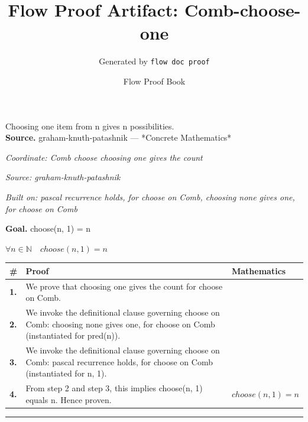 \documentclass[11pt]{article}
\title{Flow Proof Artifact: Comb-choose-one}
\author{Generated by \texttt{flow doc proof}}
\date{Flow Proof Book}
\theoremstyle{definition}
\begin{document}
\maketitle
Choosing one item from n gives n possibilities.\\[0.5em]
\textbf{Source.} graham-knuth-patashnik — *Concrete Mathematics*\\[0.5em]
\bigskip
{}\par
\smallskip\noindent\textit{Coordinate: Comb \cdot choose \cdot choosing one gives the count}\par
\smallskip\noindent\textit{Source: graham-knuth-patashnik}\par
\smallskip\noindent\textit{Built on: pascal recurrence holds, for choose on Comb, choosing none gives one, for choose on Comb}\par
\medskip
\noindent\textbf{Goal.} choose(n, 1) = n\par
\noindent$\displaystyle \forall n \in \mathbb{N}\quad choose(n, 1) = n$\par
\medskip
\noindent
\begin{tabular}{@{} >{\raggedright\arraybackslash}p{} >{\raggedright\arraybackslash}p{} >{\raggedleft\arraybackslash}p{} @{}}
\textbf{\#} & \textbf{Proof} & \textbf{Mathematics} \\
\midrule
\textbf{1.} & We prove that choosing one gives the count for choose on Comb. & \\[0.45em]
\textbf{2.} & We invoke the definitional clause governing choose on Comb: choosing none gives one, for choose on Comb (instantiated for pred(n)). & \\[0.45em]
\textbf{3.} & We invoke the definitional clause governing choose on Comb: pascal recurrence holds, for choose on Comb (instantiated for n, 1). & \\[0.45em]
\textbf{4.} & From step 2 and step 3, this implies choose(n, 1) equals n. Hence proven. & $\displaystyle choose(n, 1) = n$ \\[0.45em]
\bottomrule
\end{tabular}
\label{thm:Comb-choose-choosing_one_gives_the_count}
\par\medskip\hrule
\end{document}
